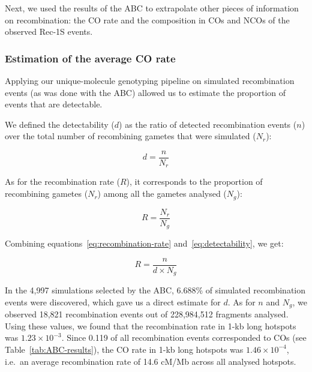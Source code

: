 Next, we used the results of the ABC to extrapolate other pieces of information on recombination: the CO rate and the composition in COs and NCOs of the observed Rec-1S events. 

\subsubsection{Estimation of the average CO rate}
Applying our unique-molecule genotyping pipeline on simulated recombination events (as was done with the ABC) allowed us to estimate the proportion of events that are detectable.

We defined the detectability ($d$) as the ratio of detected recombination events ($n$) over the total number of recombining gametes that were simulated ($N_r$):

\begin{equation} \label{eq:detectability}
    d = \frac{n}{N_r}
\end{equation}

As for the recombination rate ($R$), it corresponds to the proportion of recombining gametes ($N_r$) among all the gametes analysed ($N_g$):

\begin{equation} \label{eq:recombination-rate}
    R = \frac{N_r}{N_g}
\end{equation}

%

Combining equations~\ref{eq:recombination-rate} and~\ref{eq:detectability}, we get:

\begin{equation*}
    R = \frac{n}{d \times N_g}
\end{equation*}

In the 4,997 simulations selected by the ABC, 6.688\% of simulated recombination events were discovered, which gave us a direct estimate for $d$. 
As for $n$ and $N_g$, we observed 18,821 recombination events out of 228,984,512 fragments analysed. 
Using these values, we found that the recombination rate in 1-kb long hotspots was $1.23 \times 10^{-3}$.
Since 0.119 of all recombination events corresponded to COs (see Table~\ref{tab:ABC-results}), the CO rate in 1-kb long hotspots was $1.46 \times 10^{-4}$, i.e.\ an average recombination rate of 14.6 cM/Mb across all analysed hotspots.

